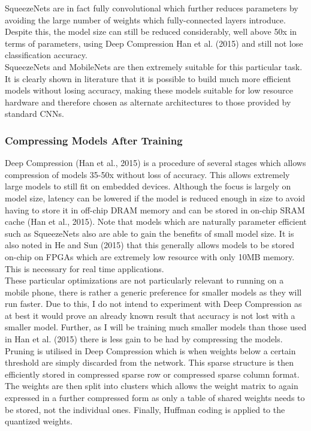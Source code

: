 \documentclass{article}
\begin{document}
SqueezeNets are in fact fully convolutional which further reduces parameters by avoiding the large number of weights which fully-connected layers introduce. Despite this, the model size can still be reduced considerably, well above 50x in terms of parameters, using Deep Compression  Han et al. (2015) and still not lose classification accuracy.\\

SqueezeNets and MobileNets are then extremely suitable for this particular task. It is clearly shown in  literature that it is possible to build much more efficient models without losing accuracy, making these models suitable for low resource hardware and therefore chosen as alternate architectures to those provided by standard CNNs. \\
\subsubsection{Compressing Models After Training}

Deep Compression (Han et al., 2015) is a procedure of several stages which allows compression of models 35-50x without loss of accuracy. This allows extremely large models to still fit on embedded devices. Although the focus is largely on model size, latency can be lowered if the model is reduced enough in size to avoid having to store it in off-chip DRAM memory and can be stored in on-chip SRAM cache (Han et al., 2015). Note that models which are naturally parameter efficient such as SqueezeNets also are able to gain the benefits of small model size. It is also noted in He and Sun (2015) that this generally allows models to be stored on-chip on FPGAs which are extremely low resource with only 10MB memory. This is necessary for real time applications.\\

These particular optimizations are not particularly relevant to running on a mobile phone, there is rather a generic preference for smaller models as they will run faster. Due to this, I do not intend to experiment with Deep Compression as at best it would prove an already known result that accuracy is not lost with a smaller model. Further, as I will be training much smaller models than those used in Han et al. (2015) there is less gain to be had by compressing the models. \\

Pruning is utilised in Deep Compression which is when weights below a certain threshold are simply discarded from the network. This sparse structure is then efficiently stored in compressed sparse row or compressed sparse column format. The weights are then split into clusters which allows the weight matrix to again expressed in a further compressed form as only a table of shared weights needs to be stored, not the individual ones. Finally, Huffman coding is applied to the quantized weights.\\
\end{document}
